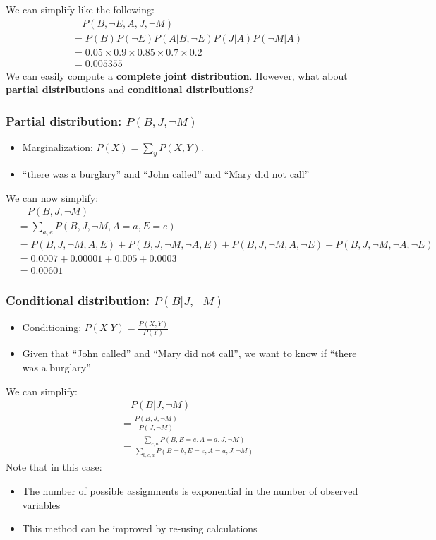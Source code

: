\documentclass[10pt]{article}
\begin{document}
We can simplify like the following:
\begin{align*}
&\quad P(B, \neg E, A, J, \neg M) \\
&= P(B) P(\neg E) P(A | B, \neg E) P(J | A) P(\neg M | A) \\
&= 0.05 \times 0.9 \times 0.85 \times 0.7 \times 0.2 \\
&= 0.005355
\end{align*}
We can easily compute a \textbf{complete joint distribution}.  However, what about \textbf{partial distributions} and \textbf{conditional distributions}?

\subsubsection*{Partial distribution: $P(B, J, \neg M)$}
\begin{itemize}
	\item Marginalization: $P(X) = \sum_y P(X, Y)$.
	\item ``there was a burglary'' and ``John called'' and ``Mary did not call''
\end{itemize}
We can now simplify:
\begin{align*}
&\quad P(B, J, \neg M) \\
&= \sum_{a, e} P(B, J, \neg M, A = a, E = e) \\
&= P(B, J, \neg M, A, E) + P(B, J, \neg M, \neg A, E) + P(B, J, \neg M, A, \neg E) + P(B, J, \neg M, \neg A, \neg E) \\
&= 0.0007 + 0.00001 + 0.005 + 0.0003 \\
&= 0.00601
\end{align*}

\subsubsection*{Conditional distribution: $P(B | J, \neg M)$}
\begin{itemize}
    \item Conditioning: $P(X | Y) = \frac{P(X, Y)}{P(Y)}$
    \item Given that ``John called'' and ``Mary did not call'', we want to know if ``there was a burglary''
\end{itemize}
We can simplify:
\begin{align*}
&\quad P(B | J, \neg M) \\
&= \frac{P(B, J, \neg M)}{P(J, \neg M)} \\
&= \frac{\sum_{e, a} P(B, E = e, A = a, J, \neg M)}{\sum_{b, e, a} P(B = b, E = e, A = a, J, \neg M)}
\end{align*}
Note that in this case:
\begin{itemize}
	\item The number of possible assignments is exponential in the number of observed variables
	\item This method can be improved by re-using calculations
\end{itemize}
\end{document}
